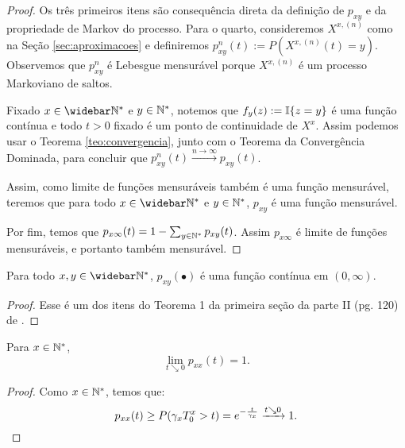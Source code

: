 \begin{proof}
  Os três primeiros itens são consequência direta da definição de
  $p_{x y}$ e da propriedade de Markov do processo. Para o quarto,
  consideremos $X^{x, (n)}$ como na Seção \ref{sec:aproximacoes} e
  definiremos $p^n_{x y}(t) := P(X^{x, (n)}(t) = y)$. Observemos que
  $p^n_{xy}$ é Lebesgue mensurável porque $X^{x, (n)}$ é um processo
  Markoviano de saltos.

  Fixado $x \in \Nzb$ e $y \in {\mathbb{N^*}}$, notemos que $f_y(z) := {\mathbb{I}}\{ z =
  y \}$ é uma função contínua e todo $t > 0$ fixado é \qc um ponto de
  continuidade de $X^x$. Assim podemos usar o Teorema
  \ref{teo:convergencia}, junto com o Teorema da Convergência
  Dominada, para concluir que $p_{x y}^n(t) \xrightarrow{n\to\infty}
  p_{x y}(t)$.

  Assim, como limite de funções mensuráveis também é uma função
  mensurável, teremos que para todo $x \in \Nzb$ e $y \in {\mathbb{N^*}}$, $p_{x
    y}$ é uma função mensurável.

  Por fim, temos que $p_{x \infty} (t) = 1 - \sum_{y \in {\mathbb{N^*}}} p_{x y}
  (t)$. Assim $p_{x \infty}$ é limite de funções mensuráveis, e
  portanto também mensurável.
\end{proof}

\begin{proposicao}
  \label{prop:transicao-continua}
  Para todo $x, y \in \Nzb$, $p_{x y}(\bullet)$ é uma função contínua
  em $(0, \infty)$.
\end{proposicao} 

\begin{proof}
  Esse é um dos itens do Teorema 1 da primeira seção da parte II
  (pg. 120) de \cite{chung:67}.
\end{proof}

\begin{proposicao}
  \label{prop:continuidade-facil}
  Para $x \in {\mathbb{N^*}}$,
  \begin{equation}
    \lim_{t \searrow 0}p_{xx}(t) = 1.   
  \end{equation}
\end{proposicao}
\begin{proof}
  Como $x \in {\mathbb{N^*}}$, temos que:
  \begin{displaymath}
    p_{xx}(t) \geq P( \gamma_x T^x_0 > t) = e^{-\frac{t}{\gamma_x}}
    \xrightarrow{t \searrow 0} 1.
    \qedhere
  \end{displaymath}
\end{proof}


